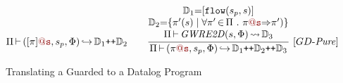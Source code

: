 \begin{figure*}[!h]
\begin{gather*}
{}{
\RETODHelper{\Pi}{[\pi]\loc{@s}}{\prevS}{\pathPure}{\effect}{\Datalog_1{\concat}\Datalog_2}
}
\qquad  
\frac{
\begin{matrix}
\Datalog_1{=} [\predFlow (\prevS, \currentS)]
\\ 
\Datalog_2{=} \s{\pi'(\currentS)\mid \forall \pi' {\,\in\,} \Pi~.~ \pi\loc{@s}{\Rightarrow} \pi')}
\\
\RETOD{\currentS}{\pathPure}{\effect}{\Datalog_3}
\end{matrix}
}{
\RETODHelper{\Pi}{\pi\loc{@s}}{\prevS}{\pathPure}{\effect}{\Datalog_1{\concat} \Datalog_2{\concat} \Datalog_3}
} ~[\toDatalogRule\m{Pure}]
\end{gather*}
\caption{Translating a Guarded \code{\omegaRE} to a Datalog Program} 
\label{fig:WRE_2_Datalog}
\end{figure*}




{
\begin{definition}
\label{def:rankingFunction}

\end{definition}
}


